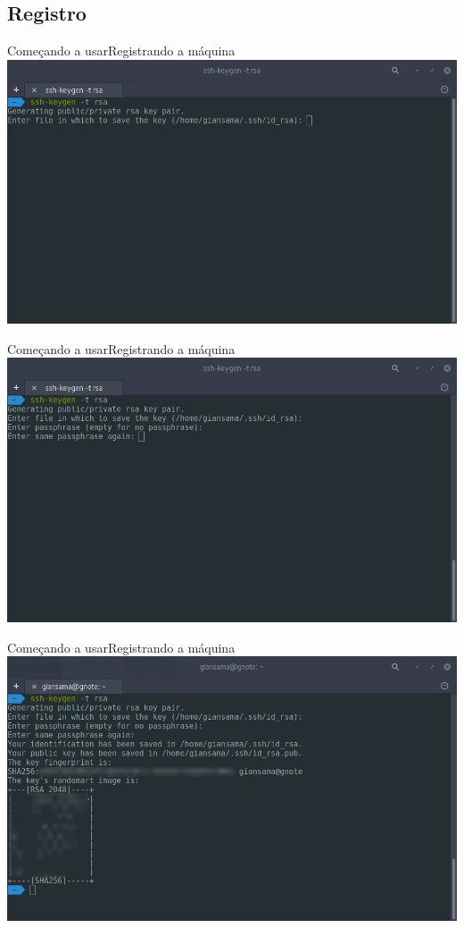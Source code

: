 \documentclass[10pt]{beamer}
\begin{document}
\subsection{Registro}
\begin{frame}{Começando a usar}{Registrando a máquina}
  \includegraphics[scale=0.42]{AAUgraphics/ssh1}
\end{frame}
\begin{frame}{Começando a usar}{Registrando a máquina}
  \includegraphics[scale=0.42]{AAUgraphics/ssh2}
\end{frame}
\begin{frame}{Começando a usar}{Registrando a máquina}
  \includegraphics[scale=0.42]{AAUgraphics/ssh3}
\end{frame}
\end{document}
